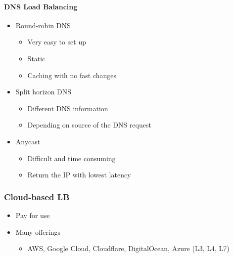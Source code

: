 \paragraph{DNS Load Balancing}
\begin{itemize}
    \item Round-robin DNS
    \begin{itemize}
        \item Very easy to set up
        \item Static
        \item Caching with no fast changes
    \end{itemize}
    \item Split horizon DNS
    \begin{itemize}
        \item Different DNS information
        \item Depending on source of the DNS request
    \end{itemize}
    \item Anycast
    \begin{itemize}
        \item Difficult and time consuming
        \item Return the IP with lowest latency
    \end{itemize}
\end{itemize}

\subsubsection{Cloud-based LB}
\begin{itemize}
    \item Pay for use
    \item Many offerings
    \begin{itemize}
        \item AWS, Google Cloud, Cloudflare, DigitalOcean, Azure (L3, L4, L7)
    \end{itemize}
\end{itemize}

